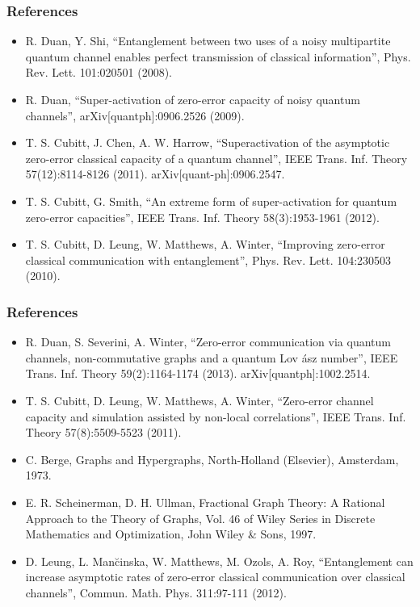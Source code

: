 \documentclass{beamer}
\begin{document}
\begin{frame}
\frametitle{References}

\begin{itemize}
\item R. Duan, Y. Shi, “Entanglement between two uses of a noisy multipartite quantum channel enables
perfect transmission of classical information”, Phys. Rev. Lett. 101:020501 (2008).
\item  R. Duan, “Super-activation of zero-error capacity of noisy quantum channels”, arXiv[quantph]:0906.2526 (2009).
\item T. S. Cubitt, J. Chen, A. W. Harrow, “Superactivation of the asymptotic zero-error classical capacity of
a quantum channel”, IEEE Trans. Inf. Theory 57(12):8114-8126 (2011). arXiv[quant-ph]:0906.2547.
\item T. S. Cubitt, G. Smith, “An extreme form of super-activation for quantum zero-error capacities”, IEEE
Trans. Inf. Theory 58(3):1953-1961 (2012).
\item T. S. Cubitt, D. Leung, W. Matthews, A. Winter, “Improving zero-error classical communication with
entanglement”, Phys. Rev. Lett. 104:230503 (2010).


\end{itemize}
\end{frame}

\begin{frame}
\frametitle{References}

\begin{itemize}
\item R. Duan, S. Severini, A. Winter, “Zero-error communication via quantum channels, non-commutative
graphs and a quantum Lov \'{a}sz number”, IEEE Trans. Inf. Theory 59(2):1164-1174 (2013). arXiv[quantph]:1002.2514.
\item T. S. Cubitt, D. Leung, W. Matthews, A. Winter, “Zero-error channel capacity and simulation assisted
by non-local correlations”, IEEE Trans. Inf. Theory 57(8):5509-5523 (2011).
\item   C. Berge, Graphs and Hypergraphs, North-Holland (Elsevier), Amsterdam, 1973.
\item E. R. Scheinerman, D. H. Ullman, Fractional Graph Theory: A Rational Approach to the Theory of Graphs,
Vol. 46 of Wiley Series in Discrete Mathematics and Optimization, John Wiley \& Sons, 1997.
\item D. Leung, L. Man\u{c}inska, W. Matthews, M. Ozols, A. Roy, “Entanglement can increase asymptotic
rates of zero-error classical communication over classical channels”, Commun. Math. Phys. 311:97-111
(2012).

\end{itemize}
\end{frame}
\end{document}
